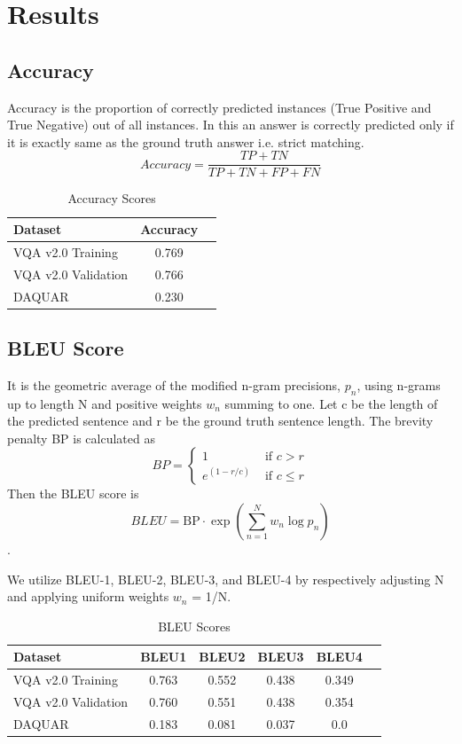 \section{Results}
\label{sec:formatting}

\subsection{Accuracy}
Accuracy is the proportion of correctly predicted instances (True Positive and True Negative) out of all instances. In this an answer is correctly predicted only if it is exactly same as the ground truth answer i.e. strict matching.
    \[Accuracy = \frac{TP + TN} {TP + TN + FP + FN} \]

\begin{table}[h]
\centering
\begin{tabular}{@{}lcc@{}}
\toprule
Dataset & Accuracy\\
\midrule
VQA v2.0 Training & 0.769 \\
VQA v2.0 Validation & 0.766\\
DAQUAR & 0.230\\
\bottomrule
\end{tabular}
\caption{Accuracy Scores}
\label{tab:example}
\end{table}



\subsection{BLEU Score}
It is the geometric average of the
modified n-gram precisions, $p_{n}$, using n-grams up to
length N and positive weights $w_{n}$ summing to one.
Let c be the length of the predicted sentence and r be the ground truth sentence length. The brevity penalty BP is calculated as
\[BP= \begin{cases}1 & \text { if } c>r \\ e^{(1-r / c)} & \text { if } c \leq r\end{cases}\]
Then the BLEU score is
\[BLEU=\mathrm{BP} \cdot \exp \left(\sum_{n=1}^N w_n \log p_n\right)\].

We utilize BLEU-1, BLEU-2, BLEU-3, and BLEU-4 by respectively adjusting N and applying uniform weights $w_{n}$ = 1/N.

\begin{table}[h]
\centering
\begin{tabular}{@{}lccccc@{}}
\toprule
Dataset & BLEU1 & BLEU2 & BLEU3 & BLEU4\\
\midrule
VQA v2.0 Training &0.763&
0.552&
0.438&
0.349

 \\
VQA v2.0 Validation&0.760&
0.551&
0.438&
0.354
\\
DAQUAR &0.183&
0.081&
0.037&
0.0

\\
\bottomrule
\end{tabular}
\caption{BLEU Scores}
\label{tab:example}
\end{table}


